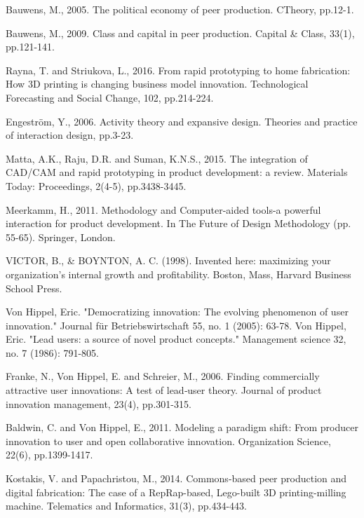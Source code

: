 Bauwens, M., 2005. The political economy of peer production. CTheory, pp.12-1.

Bauwens, M., 2009. Class and capital in peer production. Capital & Class, 33(1), pp.121-141.

Rayna, T. and Striukova, L., 2016. From rapid prototyping to home fabrication: How 3D printing is changing business model innovation. Technological Forecasting and Social Change, 102, pp.214-224.

Engeström, Y., 2006. Activity theory and expansive design. Theories and practice of interaction design, pp.3-23.

Matta, A.K., Raju, D.R. and Suman, K.N.S., 2015. The integration of CAD/CAM and rapid prototyping in product development: a review. Materials Today: Proceedings, 2(4-5), pp.3438-3445.

Meerkamm, H., 2011. Methodology and Computer-aided tools-a powerful interaction for product development. In The Future of Design Methodology (pp. 55-65). Springer, London.


VICTOR, B., & BOYNTON, A. C. (1998). Invented here: maximizing your organization's internal growth and profitability. Boston, Mass, Harvard Business School Press.

Von Hippel, Eric. "Democratizing innovation: The evolving phenomenon of user innovation." Journal für Betriebswirtschaft 55, no. 1 (2005): 63-78.
Von Hippel, Eric. "Lead users: a source of novel product concepts." Management science 32, no. 7 (1986): 791-805.

Franke, N., Von Hippel, E. and Schreier, M., 2006. Finding commercially attractive user innovations: A test of lead‐user theory. Journal of product innovation management, 23(4), pp.301-315.

Baldwin, C. and Von Hippel, E., 2011. Modeling a paradigm shift: From producer innovation to user and open collaborative innovation. Organization Science, 22(6), pp.1399-1417.


Kostakis, V. and Papachristou, M., 2014. Commons-based peer production and digital fabrication: The case of a RepRap-based, Lego-built 3D printing-milling machine. Telematics and Informatics, 31(3), pp.434-443.

